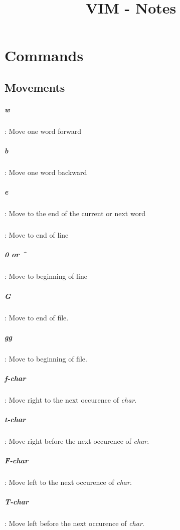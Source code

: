 \documentclass[10pt,letterpaper]{book}
\begin{document}
\title{VIM - Notes}
\tableofcontents
\chapter{Commands}
\section{Movements}
\paragraph{w}: Move one word forward
\paragraph{b}: Move one word backward
\paragraph{e}: Move to the end of the current or next word
\paragraph{\textdollar}: Move to end of line
\paragraph{0 or \^{}}: Move to beginning of line
\paragraph{G}: Move to end of file.
\paragraph{gg}: Move to beginning of file.
\paragraph{f-char}: Move right to the next occurence of \textit{char}.
\paragraph{t-char}: Move right before the next occurence of \textit{char}.
\paragraph{F-char}: Move left to the next occurence of \textit{char}.
\paragraph{T-char}: Move left before the next occurence of \textit{char}.
\end{document}
